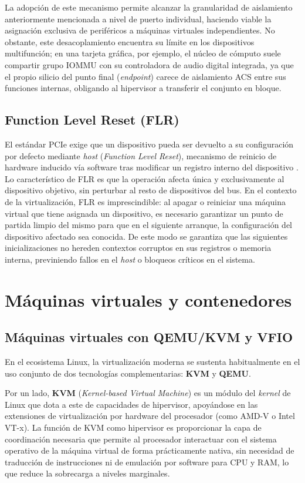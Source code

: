 La adopción de este mecanismo permite alcanzar la granularidad de aislamiento anteriormente mencionada a nivel de puerto individual,
haciendo viable la asignación exclusiva de periféricos a máquinas virtuales independientes. No obstante, este desacoplamiento encuentra 
su límite en los dispositivos multifunción; en una tarjeta gráfica, por ejemplo, el núcleo de cómputo suele compartir grupo IOMMU con su
controladora de audio digital integrada, ya que el propio silicio del punto final (\textit{endpoint}) carece de aislamiento ACS entre sus
funciones internas, obligando al hipervisor a transferir el conjunto en bloque.

\subsection{Function Level Reset (FLR)}

El estándar PCIe exige que un dispositivo pueda ser devuelto a su configuración por defecto mediante \textit{host}
(\textit{Function Level Reset}), mecanismo de reinicio de hardware inducido vía software tras modificar un registro interno del dispositivo 
\cite{pcisig2022,amd_pg344_flr}. 
Lo característico de FLR es que la operación afecta única y exclusivamente al dispositivo objetivo, sin perturbar al resto de dispositivos
del bus.
En el contexto de la virtualización, FLR es imprescindible: al apagar o reiniciar una máquina virtual que tiene asignada un dispositivo, 
es necesario garantizar un punto de partida limpio del mismo para que en el siguiente arranque, la configuración del dispositivo afectado
sea conocida. De este modo se garantiza que las siguientes inicializaciones 
no hereden contextos corruptos en sus registros o memoria interna, previniendo fallos en el \textit{host} o bloqueos críticos 
en el sistema.
 

\section{Máquinas virtuales y contenedores}

\subsection{Máquinas virtuales con QEMU/KVM y VFIO}

En el ecosistema Linux, la virtualización moderna se sustenta habitualmente en el uso conjunto de dos tecnologías complementarias: \textbf{KVM} y \textbf{QEMU}.

Por un lado, \textbf{KVM} (\textit{Kernel-based Virtual Machine}) es un módulo del \textit{kernel} de Linux que dota a este de capacidades de hipervisor, 
apoyándose en las extensiones de virtualización por hardware del procesador (como AMD-V o Intel VT-x). La función de KVM como hipervisor es proporcionar la 
capa de coordinación necesaria que permite al procesador interactuar con el sistema operativo de la máquina virtual de forma prácticamente nativa, sin necesidad
 de traducción de instrucciones ni de emulación por software para CPU y RAM, lo que reduce la sobrecarga a niveles marginales.

